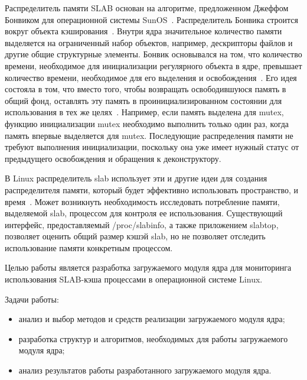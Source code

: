 
Распределитель памяти SLAB основан на алгоритме, предложенном Джеффом Бонвиком для операционной системы SunOS~\cite{slab_info}.
Распределитель Бонвика строится вокруг объекта кэширования~\cite{slab_info}.
Внутри ядра значительное количество памяти выделяется на ограниченный набор объектов, например, дескрипторы файлов и другие общие структурные элементы.
Бонвик основывался на том, что количество времени, необходимое для инициализации регулярного объекта в ядре, превышает количество времени, необходимое для его выделения и освобождения~\cite{slab_info}.
Его идея состояла в том, что вместо того, чтобы возвращать освободившуюся память в общий фонд, оставлять эту память в проинициализированном состоянии для использования в тех же целях~\cite{slab_info}.
Например, если память выделена для mutex, функцию инициализации mutex необходимо выполнить только один раз, когда память впервые выделяется для mutex.
Последующие распределения памяти не требуют выполнения инициализации, поскольку она уже имеет нужный статус от предыдущего освобождения и обращения к деконструктору.

В Linux распределитель slab использует эти и другие идеи для создания распределителя памяти, который будет эффективно использовать пространство, и время~\cite{slab_info}.
Может возникнуть необходимость исследовать потребление памяти, выделяемой slab, процессом для контроля ее использования.
Существующий интерфейс, предоставляемый /proc/slabinfo, а также приложением slabtop, позволяет оценить общий размер кэшэй slab, но не позволяет отследить использование памяти конкретным процессом.

Целью работы является разработка загружаемого модуля ядра для мониторинга использования SLAB-кэша процессами в операционной системе Linux.

Задачи работы:
\begin{itemize}
	\item анализ и выбор методов и средств реализации загружаемого модуля ядра;
	\item разработка структур и алгоритмов, необходимых для работы загружаемого модуля ядра;
	\item анализ результатов работы разработанного загружаемого модуля ядра.
\end{itemize}

\clearpage
